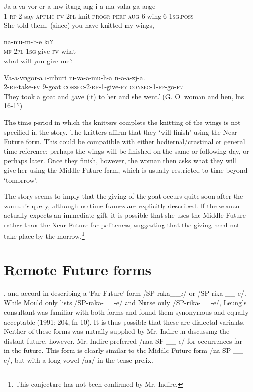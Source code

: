 \documentclass[output=paper]{langsci/langscibook}
\begin{document}
\gll Ja-a-va-vor-er-a     mw-ituŋg-aŋg-i   a-ma-vaha   ga-aŋge \\
1-\textsc{rp-}2-say-\textsc{applic-fv}    \textsc{2pl-}knit-\textsc{progr-perf}  \textsc{aug-}6-wing  6-\textsc{1sg.poss} \\
\glt She told them, (since) you have knitted my wings, 

\gll na-mu-m-b-e       kɪ?  \\
\textsc{mf-2pl-1sg-}give-\textsc{fv}    what \\
\glt what will you give me?

\gll Va-a-vʊgʊr-a    ɪ{}-mburi  nɪ-va-a-mu-h-a    n-a-a-zj-a. \\
2\textsc{{}-rp}{}-take-\textsc{fv}    9-goat    \textsc{consec-2-rp}{}-1-give-\textsc{fv}  \textsc{consec-1-rp-}go-\textsc{fv} \\
\glt They took a goat and gave (it) to her and she went.’ (G. O. woman and hen, lns 16-17)
\z

The time period in which the knitters complete the knitting of the wings is not specified in the story. The knitters affirm that they ‘will finish’ using the Near Future form. This could be compatible with either hodiernal/crastinal or general time reference: perhaps the wings will be finished on the same or following day, or perhaps later. Once they finish, however, the woman then asks what they will give her using the Middle Future form, which is usually restricted to time beyond ‘tomorrow’. 

The story seems to imply that the giving of the goat occurs quite soon after the woman’s query, although no time frames are explicitly described. If the woman actually expects an immediate gift, it is possible that she uses the Middle Future rather than the Near Future for politeness, suggesting that the giving need not take place by the morrow.\footnote{ This conjecture has not been confirmed by Mr. Indire.}

\section[Remote Future forms]{Remote Future forms} \label{sec:sarvasy:6}
\citet{Mould1981}, \citet{Leung1991} and \citet{Nurse2003} accord in describing a ‘Far Future’ %
%
form /SP-raka\_\_e/ or /SP-rika-\_\_-e/. While Mould only lists /SP-raka-\_\_-e/ and Nurse only /SP-rika-\_\_-e/, Leung’s consultant was familiar with both forms and found them synonymous and equally acceptable (1991: 204, fn 10). It is thus possible that these are dialectal variants. Neither of these forms was initially supplied by Mr. Indire in discussing the distant future, however. Mr. Indire preferred /naa-SP-\_\_-e/ for occurrences far in the future. This form is clearly similar to the Middle Future form /na-SP-\_\_-e/, but with a long vowel /aa/ in the tense prefix. 
\end{document}
